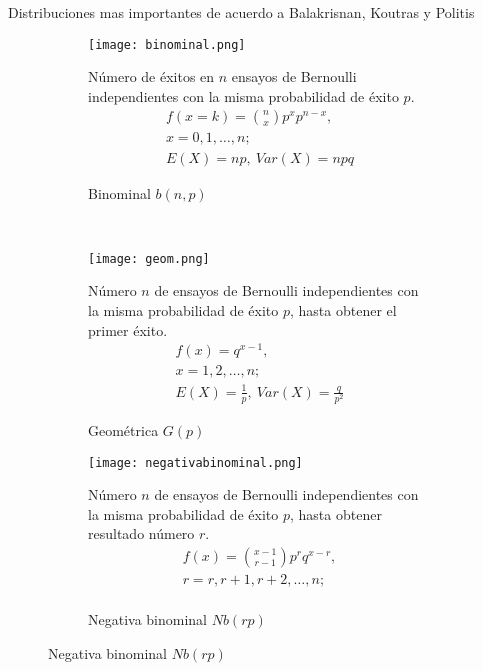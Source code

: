 Distribuciones mas importantes de acuerdo a Balakrisnan, Koutras y Politis\cite{bala20}
\begin{figure}[H]
	\begin{subfigure}[t]{.475\textwidth}
		\texttt{[image: binominal.png]}\caption{Binominal $b(n,p)$}
Número de éxitos en $n$ ensayos de Bernoulli independientes con la misma probabilidad de éxito $p$.
		\begin{equation}
		\begin{matrix}
		f(x=k)=\binom{n}{x}p^xp^{n-x},\\
		x=0,1,\ldots,n;\\
		E(X)=np,\ Var(X)=npq
		\end{matrix}
		\end{equation}
	\end{subfigure}\ \ \ \ 
\begin{subfigure}[t]{.475\textwidth}
		\texttt{[image: geom.png]}\caption{Geométrica $G(p)$}
		Número $n$ de ensayos de Bernoulli independientes con la misma probabilidad de éxito $p$, hasta obtener el primer éxito.
		\begin{equation}
		\begin{matrix}
		f(x)=q^{x-1},\\
		x=1,2,\ldots,n;\\
		E(X)=\frac{1}{p},\ Var(X)=\frac{q}{p^2}
		\end{matrix}
		\end{equation}
	\end{subfigure}
	\begin{subfigure}[t]{.5\textwidth}
		\texttt{[image: negativabinominal.png]}\caption{Negativa binominal $Nb(rp)$}
		Número $n$ de ensayos de Bernoulli independientes con la misma probabilidad de éxito $p$, hasta obtener resultado número $r$.
		\begin{equation}
		\begin{matrix}
		f(x)=\binom{x-1}{r-1}p^rq^{x-r},\\
		r=r,r+1,r+2,\ldots,n;\\

\end{matrix}
\end{equation}
\end{subfigure}
\end{figure}
